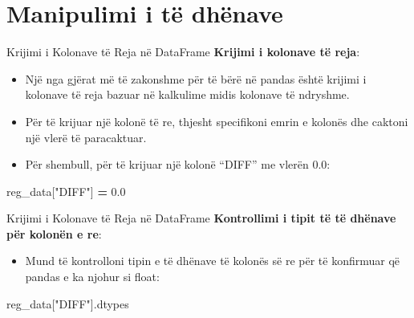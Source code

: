 \documentclass[
  ignorenonframetext,
]{beamer}
\newenvironment{Shaded}{\begin{snugshade}}{\end{snugshade}}
\newcommand{\FloatTok}[1]{\textcolor[rgb]{0.00,0.00,0.81}{#1}}
\newcommand{\NormalTok}[1]{#1}
\newcommand{\OperatorTok}[1]{\textcolor[rgb]{0.81,0.36,0.00}{\textbf{#1}}}
\newcommand{\StringTok}[1]{\textcolor[rgb]{0.31,0.60,0.02}{#1}}
\providecommand{\tightlist}{%
  \setlength{\itemsep}{0pt}\setlength{\parskip}{0pt}}
\begin{document}
\hypertarget{manipulimi-i-tuxeb-dhuxebnave}{%
\section{Manipulimi i të dhënave}\label{manipulimi-i-tuxeb-dhuxebnave}}

\begin{frame}[fragile]{Krijimi i Kolonave të Reja në DataFrame}
\protect\hypertarget{krijimi-i-kolonave-tuxeb-reja-nuxeb-dataframe}{}
\textbf{Krijimi i kolonave të reja}:

\begin{itemize}
\item
  Një nga gjërat më të zakonshme për të bërë në pandas është krijimi i
  kolonave të reja bazuar në kalkulime midis kolonave të ndryshme.
\item
  Për të krijuar një kolonë të re, thjesht specifikoni emrin e kolonës
  dhe caktoni një vlerë të paracaktuar.
\item
  Për shembull, për të krijuar një kolonë ``DIFF'' me vlerën 0.0:
\end{itemize}

\begin{Shaded}
\begin{Highlighting}[]
\NormalTok{    reg\_data[}\StringTok{"DIFF"}\NormalTok{] }\OperatorTok{=} \FloatTok{0.0}
\end{Highlighting}
\end{Shaded}
\end{frame}

\begin{frame}[fragile]{Krijimi i Kolonave të Reja në DataFrame}
\protect\hypertarget{krijimi-i-kolonave-tuxeb-reja-nuxeb-dataframe-1}{}
\textbf{Kontrollimi i tipit të të dhënave për kolonën e re}:

\begin{itemize}
\tightlist
\item
  Mund të kontrolloni tipin e të dhënave të kolonës së re për të
  konfirmuar që pandas e ka njohur si float:
\end{itemize}

\begin{Shaded}
\begin{Highlighting}[]
\NormalTok{    reg\_data[}\StringTok{"DIFF"}\NormalTok{].dtypes}
\end{Highlighting}
\end{Shaded}
\end{frame}
\end{document}
